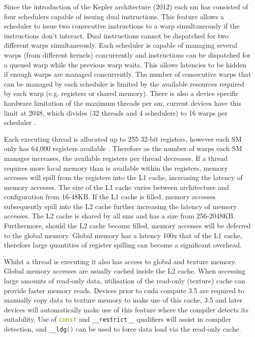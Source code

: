      Since the introduction of the Kepler architecture (2012) \cite{NV_KEPLER} each \gls{sm} has consisted of four schedulers capable of issuing dual instructions. This feature allows a scheduler to issue two consecutive instructions to a warp simultaneously if the instructions don't interact. Dual instructions cannot be dispatched for two different warps simultaneously. Each scheduler is capable of managing several warps (from different kernels) concurrently and instructions can be dispatched for a queued warp while the previous warp waits. This allows latencies to be hidden if enough warps are managed concurrently. The number of consecutive warps that can be managed by each scheduler is limited by the available resources required by each warp (e.g. registers or shared memory). There is also a device specific hardware limitation of the maximum threads per \gls{sm}, current devices have this limit at 2048, which divides (32 threads and 4 schedulers) to 16 warps per scheduler \cite{PM13}.
      
      Each executing thread is allocated up to 255 32-bit registers, however each SM only has 64,000 registers available \cite{MAXWELL_TUNING}. Therefore as the number of warps each SM manages increases, the available registers per thread decreases. If a thread requires more local memory than is available within the registers, memory accesses will spill from the registers into the L1 cache, increasing the latency of memory accesses. The size of the L1 cache varies between architecture and configuration from 16-48KB. If the L1 cache is filled, memory accesses subsequently spill into the L2 cache further increasing the latency of memory accesses. The L2 cache is shared by all \glspl{sm} and has a size from 256-2048KB. Furthermore, should the L2 cache become filled, memory accesses will be deferred to the global memory. Global memory has a latency 100x that of the L1 cache, therefore large quantities of register spilling can become a significant overhead.
      
      Whilst a thread is executing it also has access to global and texture memory. Global memory accesses are usually cached inside the L2 cache. When accessing large amounts of read-only data, utilisation of the read-only (texture) cache can provide faster memory reads. Devices prior to \gls{cuda} compute 3.5 are required to manually copy data to texture memory to make use of this cache, 3.5 and later devices will automatically make use of this feature where the compiler detects its suitability. Use of \lstinline[language={C++}]!const! and \lstinline[language={C++}]!__restrict__! qualifiers will assist in compiler detection, and \lstinline[language={C++}]!__ldg()! can be used to force data load via the read-only cache.
      
